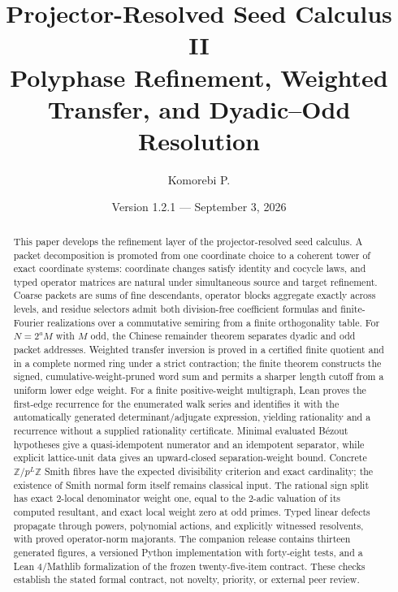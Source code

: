 \documentclass[11pt]{article}
\title{\textbf{Projector-Resolved Seed Calculus II}\\[0.45em]
\large Polyphase Refinement, Weighted Transfer, and Dyadic--Odd Resolution}
\author{Komorebi P.}
\date{Version 1.2.1 --- September 3, 2026}
\theoremstyle{definition}
\theoremstyle{remark}
\begin{document}
\maketitle

\begin{abstract}
This paper develops the refinement layer of the projector-resolved seed
calculus. A packet decomposition is promoted from one coordinate choice to a
coherent tower of exact coordinate systems: coordinate changes satisfy
identity and cocycle laws, and typed operator matrices are natural under
simultaneous source and target refinement. Coarse packets are sums of fine
descendants, operator blocks aggregate exactly across levels, and residue
selectors admit both division-free coefficient formulas and finite-Fourier
realizations over a commutative semiring from a finite orthogonality table.
For $N=2^aM$ with $M$ odd, the Chinese remainder theorem separates dyadic and
odd packet addresses. Weighted transfer inversion is proved in a certified
finite quotient and in a complete normed ring under a strict contraction;
the finite theorem constructs the signed, cumulative-weight-pruned word sum
and permits a sharper length cutoff from a uniform lower edge weight. For a
finite positive-weight multigraph, Lean proves the first-edge recurrence for
the enumerated walk series and identifies it with the automatically generated
determinant/adjugate expression, yielding rationality and a recurrence without
a supplied rationality certificate. Minimal evaluated B\'ezout hypotheses
give a quasi-idempotent numerator and an idempotent separator, while explicit
lattice-unit data gives an upward-closed separation-weight bound. Concrete
$\mathbb Z/p^L\mathbb Z$ Smith fibres have the expected divisibility criterion
and exact cardinality; the existence of Smith normal form itself remains
classical input. The rational sign split has exact $2$-local denominator
weight one, equal to the $2$-adic valuation of its computed resultant, and
exact local weight zero at odd primes. Typed linear defects propagate through
powers, polynomial actions, and explicitly witnessed resolvents, with proved
operator-norm majorants. The companion release contains thirteen generated
figures, a versioned Python implementation with forty-eight tests, and a Lean
4/Mathlib formalization of the frozen twenty-five-item contract. These checks
establish the stated formal contract, not novelty, priority, or external peer
review.
\end{abstract}
\end{document}
